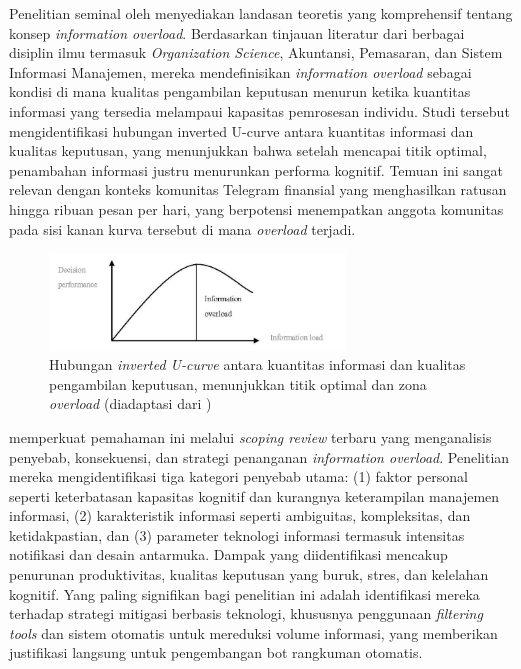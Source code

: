 Penelitian seminal oleh \textcite{eppler2004} menyediakan landasan teoretis yang komprehensif tentang konsep \textit{information overload}. Berdasarkan tinjauan literatur dari berbagai disiplin ilmu termasuk \textit{Organization Science}, Akuntansi, Pemasaran, dan Sistem Informasi Manajemen, mereka mendefinisikan \textit{information overload} sebagai kondisi di mana kualitas pengambilan keputusan menurun ketika kuantitas informasi yang tersedia melampaui kapasitas pemrosesan individu. Studi tersebut mengidentifikasi hubungan inverted U-curve antara kuantitas informasi dan kualitas keputusan, yang menunjukkan bahwa setelah mencapai titik optimal, penambahan informasi justru menurunkan performa kognitif. Temuan ini sangat relevan dengan konteks komunitas Telegram finansial yang menghasilkan ratusan hingga ribuan pesan per hari, yang berpotensi menempatkan anggota komunitas pada sisi kanan kurva tersebut di mana \textit{overload} terjadi.

\begin{figure}[H]
  \centering
  \includegraphics[width=0.7\textwidth]{image/information-overload-curve.png}
  \caption{Hubungan \textit{inverted U-curve} antara kuantitas informasi dan kualitas pengambilan keputusan, menunjukkan titik optimal dan zona \textit{overload} (diadaptasi dari \textcite{eppler2004})}
  \label{fig:info-overload}
\end{figure}

\textcite{shahrzadi2024} memperkuat pemahaman ini melalui \textit{scoping review} terbaru yang menganalisis penyebab, konsekuensi, dan strategi penanganan \textit{information overload}. Penelitian mereka mengidentifikasi tiga kategori penyebab utama: (1) faktor personal seperti keterbatasan kapasitas kognitif dan kurangnya keterampilan manajemen informasi, (2) karakteristik informasi seperti ambiguitas, kompleksitas, dan ketidakpastian, dan (3) parameter teknologi informasi termasuk intensitas notifikasi dan desain antarmuka. Dampak yang diidentifikasi mencakup penurunan produktivitas, kualitas keputusan yang buruk, stres, dan kelelahan kognitif. Yang paling signifikan bagi penelitian ini adalah identifikasi mereka terhadap strategi mitigasi berbasis teknologi, khususnya penggunaan \textit{filtering tools} dan sistem otomatis untuk mereduksi volume informasi, yang memberikan justifikasi langsung untuk pengembangan bot rangkuman otomatis.

